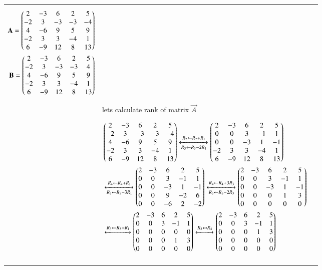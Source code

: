 \begin{longtable}{|l|l|l|}
{\begin{align}
    \mathbf{A}=\begin{pmatrix}2&-3&6&2&5\\-2&3&-3&-3&-4\\4&-6&9&5&9\\-2&3&3&-4&1\\6&-9&12&8&13\end{pmatrix}\label{eq:solutions/2014/dec/75/A}\\
    \mathbf{B}=\begin{pmatrix}2&-3&6&2&5\\-2&3&-3&-3&4\\4&-6&9&5&9\\-2&3&3&-4&1\\6&-9&12&8&13\end{pmatrix}\label{eq:solutions/2014/dec/75/B}
\end{align}}&\\&lets calculate rank of matrix $\vec{A}$&\\&\parbox{14cm}{\begin{align}
    &\begin{pmatrix}2&-3&6&2&5\\-2&3&-3&-3&-4\\4&-6&9&5&9\\-2&3&3&-4&1\\6&-9&12&8&13\end{pmatrix}\xleftrightarrow[R_3\leftarrow R_3-2R_1]{R_2\leftarrow R_2+R_1}\begin{pmatrix}2&-3&6&2&5\\0&0&3&-1&1\\0&0&-3&1&-1\\-2&3&3&-4&1\\6&-9&12&8&13\end{pmatrix}\\&\xleftrightarrow[R_5\leftarrow R_5-3R_1]{R_4\leftarrow R_4+R_1}\begin{pmatrix}2&-3&6&2&5\\0&0&3&-1&1\\0&0&-3&1&-1\\0&0&9&-2&6\\0&0&-6&2&-2\end{pmatrix}\xleftrightarrow[R_5\leftarrow R_5-2R_3]{R_4\leftarrow R_4+3R_3}\begin{pmatrix}2&-3&6&2&5\\0&0&3&-1&1\\0&0&-3&1&-1\\0&0&0&1&3\\0&0&0&0&0\end{pmatrix}\\&\xleftrightarrow[]{R_3\leftarrow R_3+R_1}\begin{pmatrix}2&-3&6&2&5\\0&0&3&-1&1\\0&0&0&0&0\\0&0&0&1&3\\0&0&0&0&0\end{pmatrix}\xleftrightarrow[]{R_3\leftrightarrow R_4}\begin{pmatrix}2&-3&6&2&5\\0&0&3&-1&1\\0&0&0&1&3\\0&0&0&0&0\\0&0&0&0&0\end{pmatrix}
\end{align}}&\\&\parbox{14cm}{\begin{align}

\end{align}}
\end{longtable}
